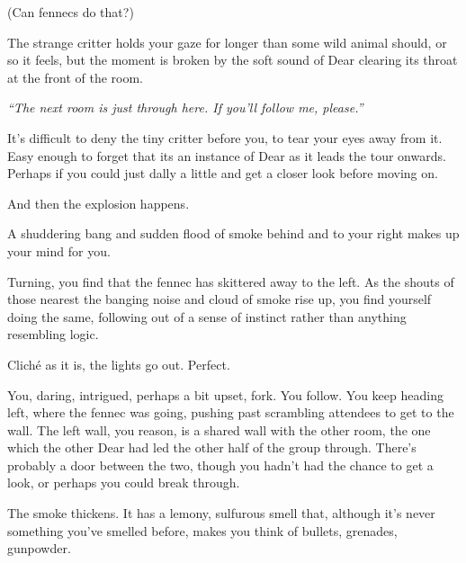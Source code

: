 \null
\vfill

\begin{flushright}
\footnotesize
  (Can fennecs do that?)
\end{flushright}

\newpage

\null
\vfill

The strange critter holds your gaze for longer than some wild animal should, or so it feels, but the moment is broken by the soft sound of Dear clearing its throat at the front of the room.

\emph{``The next room is just through here. If you'll follow me, please.''}

It's difficult to deny the tiny critter before you, to tear your eyes away from it. Easy enough to forget that its an instance of Dear as it leads the tour onwards. Perhaps if you could just dally a little and get a closer look before moving on.

And then the explosion happens.

\vfill

\newpage

\null
\vfill

A shuddering bang and sudden flood of smoke behind and to your right makes up your mind for you.

Turning, you find that the fennec has skittered away to the left. As the shouts of those nearest the banging noise and cloud of smoke rise up, you find yourself doing the same, following out of a sense of instinct rather than anything resembling logic.

\vfill

\newpage

\null
\vfill

Cliché as it is, the lights go out. Perfect.

\vfill

\newpage

\null
\vfill

You, daring, intrigued, perhaps a bit upset, fork. You follow. You keep heading left, where the fennec was going, pushing past scrambling attendees to get to the wall. The left wall, you reason, is a shared wall with the other room, the one which the other Dear had led the other half of the group through. There's probably a door between the two, though you hadn't had the chance to get a look, or perhaps you could break through.

The smoke thickens. It has a lemony, sulfurous smell that, although it's never something you've smelled before, makes you think of bullets, grenades, gunpowder.

